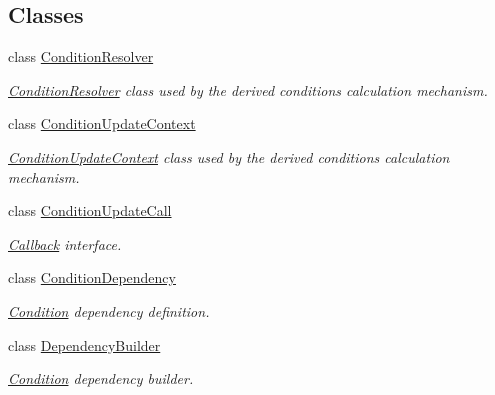 \subsection*{Classes}
\begin{DoxyCompactItemize}
\item 
class \hyperlink{class_d_d4hep_1_1_conditions_1_1_condition_resolver}{ConditionResolver}
\begin{DoxyCompactList}\small\item\em \hyperlink{class_d_d4hep_1_1_conditions_1_1_condition_resolver}{ConditionResolver} class used by the derived conditions calculation mechanism. \item\end{DoxyCompactList}\item 
class \hyperlink{class_d_d4hep_1_1_conditions_1_1_condition_update_context}{ConditionUpdateContext}
\begin{DoxyCompactList}\small\item\em \hyperlink{class_d_d4hep_1_1_conditions_1_1_condition_update_context}{ConditionUpdateContext} class used by the derived conditions calculation mechanism. \item\end{DoxyCompactList}\item 
class \hyperlink{class_d_d4hep_1_1_conditions_1_1_condition_update_call}{ConditionUpdateCall}
\begin{DoxyCompactList}\small\item\em \hyperlink{class_d_d4hep_1_1_callback}{Callback} interface. \item\end{DoxyCompactList}\item 
class \hyperlink{class_d_d4hep_1_1_conditions_1_1_condition_dependency}{ConditionDependency}
\begin{DoxyCompactList}\small\item\em \hyperlink{class_d_d4hep_1_1_conditions_1_1_condition}{Condition} dependency definition. \item\end{DoxyCompactList}\item 
class \hyperlink{class_d_d4hep_1_1_conditions_1_1_dependency_builder}{DependencyBuilder}
\begin{DoxyCompactList}\small\item\em \hyperlink{class_d_d4hep_1_1_conditions_1_1_condition}{Condition} dependency builder. \item\end{DoxyCompactList}\item 

\end{DoxyCompactItemize}
